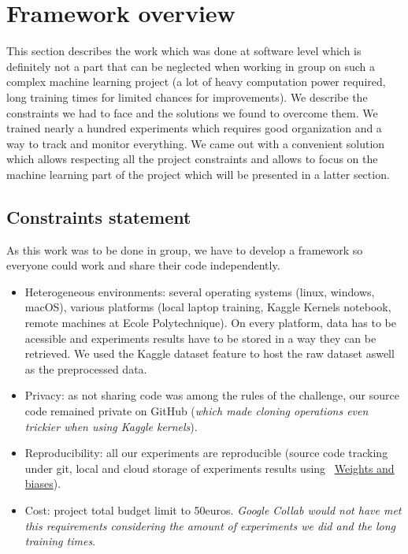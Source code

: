 \section{Framework overview}
\label{sec:framework}
This section describes the work which was done at software level which is definitely not a part that can be neglected when working in group on such a complex machine learning project (a lot of heavy computation power required, long training times for limited chances for improvements).  We describe the constraints we had to face and the solutions we found to overcome them. We trained nearly a hundred experiments which requires good organization and a way to track and monitor everything.
We came out with a convenient solution which allows respecting all the project constraints and allows to focus on the machine learning part of the project which will be presented in a latter section.


\subsection*{Constraints statement}
\label{sec:Constraints}
As this work was to  be done in group, we have to develop a framework so everyone could work and share their code independently.
\begin{itemize}
    \item Heterogeneous environments: several operating systems (linux, windows, macOS), various platforms (local laptop training, Kaggle Kernels notebook, remote machines at Ecole Polytechnique). On every platform, data has to be acessible and experiments results have to be stored in a way they can be retrieved. We used the Kaggle dataset feature to  host the raw dataset aswell as the preprocessed data.
    \item Privacy: as not sharing code was among the rules of the challenge, our source code remained private on GitHub (\textit{which made cloning operations even trickier when using Kaggle kernels}).
    \item Reproducibility: all our experiments are reproducible (source code tracking under git, local and cloud storage of experiments results using ~\href{https://wandb.ai/molecule-nlp-altegrad-23/molecule-nlp}{Weights and biases}).
    \item Cost: project total budget limit to 50euros. \textit{Google Collab would not have met this requirements considering the amount of experiments we did and the long training times}.
\end{itemize}


